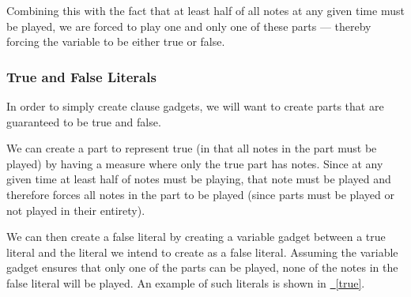 \documentclass[11pt,letterpaper]{article}
\newcommand{\figref}[2][{}]{\hyperref[#2]{\figurename~\ref{#2}#1}}
\begin{document}
Combining this with the fact that at least half of all notes at any given time must be played, we are forced to play one and only one of these parts --- thereby forcing the variable to be either true or false.


\subsubsection{True and False Literals}
In order to simply create clause gadgets, we will want to create parts that are guaranteed to be true and false.

We can create a part to represent true (in that all notes in the part must be played) by having a measure where only the true part has notes. Since at any given time at least half of notes must be playing, that note must be played and therefore forces all notes in the part to be played (since parts must be played or not played in their entirety).

We can then create a false literal by creating a variable gadget between a true literal and the literal we intend to create as a false literal. Assuming the variable gadget ensures that only one of the parts can be played, none of the notes in the false literal will be played. An example of such literals is shown in \figref{true}.
\end{document}
